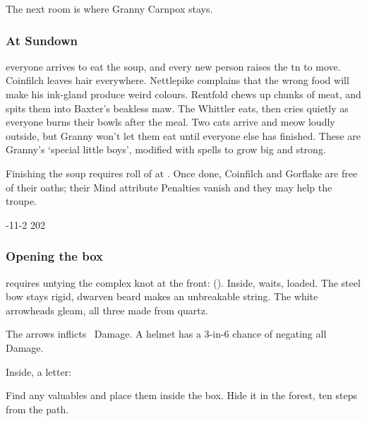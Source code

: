 \documentclass[10pt,twoside]{book}
\begin{document}
The next room is where Granny Carnpox stays.

\subsubsection{At Sundown}
everyone arrives to eat the soup, and every new person raises the \gls{tn} to move.
Coinfilch leaves hair everywhere.
Nettlepike complains that the wrong food will make his ink-gland produce weird colours.
Rentfold chews up chunks of meat, and spits them into Baxter's beakless maw.
The Whittler eats, then cries quietly as everyone burns their bowls after the meal.
Two cats arrive and meow loudly outside, but Granny won't let them eat until everyone else has finished.
These are Granny's `special little boys', modified with \glspl{spell} to grow big and strong.


Finishing the soup requires  roll of  at \tn[10].
Once done, Coinfilch and Gorflake are free of their oaths; their Mind \gls{attribute} Penalties vanish and they may help the troupe.

%
  {{-1}{1}{-2}}%
  {{2}{0}{2}}%
  {%
    \Dagger
  }%
  {}%
  {}%
  {}%

\setcounter{diceNo}{0}
\showStdSpells

\subsubsection{Opening the box}\label{insideTheBox}
requires untying the complex knot at the front:  (\tn[10]).
Inside,  waits, loaded.
The steel bow stays rigid, dwarven beard makes an unbreakable string.
The white arrowheads gleam, all three made from quartz.

The arrows inflicts ~Damage.
A helmet has a 3-in-6 chance of negating all Damage.

Inside, a letter:

\begin{speechtext}
  Find any valuables and place them inside the box.
  Hide it in the forest, ten steps from the path.
\end{speechtext}
\end{document}
